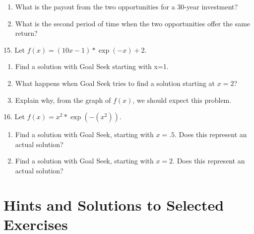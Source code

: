 \documentclass[10pt,]{book}
\theoremstyle{plain}
\theoremstyle{definition}
\theoremstyle{definition}
\begin{document}
\begin{exerciselist}
\begin{enumerate}[label=(\alph*)]
\item\hypertarget{li-110}{} What is the payout from the two opportunities for a 30-year investment?%
\item\hypertarget{li-111}{} What is the second period of time when the two opportunities offer the same return?%
\end{enumerate}
\par\smallskip
\item[15.]\hypertarget{exercise-89}{} Let \(f(x) = (10 x-1) *\exp(-x) + 2\).%
\leavevmode%
\begin{enumerate}[label=(\alph*)]
\item\hypertarget{li-112}{} Find a solution with Goal Seek starting with x=1.%
\item\hypertarget{li-113}{} What happens when Goal Seek tries to find a solution starting at \(x=2\)?%
\item\hypertarget{li-114}{} Explain why, from the graph of \(f(x)\), we should expect this problem.%
\end{enumerate}
\par\smallskip
\item[16.]\hypertarget{exercise-90}{} Let \(f(x) = x^2*\exp(-(x^2))\).%
\leavevmode%
\begin{enumerate}[label=(\alph*)]
\item\hypertarget{li-115}{} Find a solution with Goal Seek, starting with \(x=.5\).  Does this represent an actual solution?%
\item\hypertarget{li-116}{} Find a solution with Goal Seek, starting with \(x=2\).  Does this represent an actual solution?%
\end{enumerate}
\par\smallskip
\end{exerciselist}
%
%
%
\appendix
%
\typeout{************************************************}
\typeout{************************************************}
\chapter[{Hints and Solutions to Selected Exercises}]{Hints and Solutions to Selected Exercises}\label{appendix-1}
\end{document}
